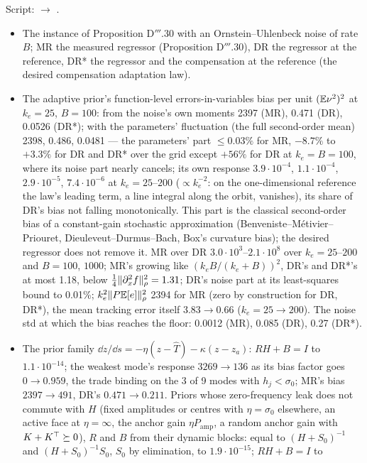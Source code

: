 Script:  $\to$ .
\begin{itemize}
  \item The instance of Proposition D$'''$.30 with an Ornstein--Uhlenbeck noise of rate $B$; MR the measured regressor
    (Proposition D$'''$.30), DR the regressor at the reference, DR* the regressor and the compensation at the
    reference (the desired compensation adaptation law).
  \item The adaptive prior's function-level errors-in-variables bias per unit $(\mathbb{E}\nu^2)^2$ at $k_e=25$, $B=100$: from
    the noise's own moments 2397 (MR), 0.471 (DR), 0.0526 (DR*); with the parameters' fluctuation (the full
    second-order mean) 2398, 0.486, 0.0481 --- the parameters' part $\le0.03\%$ for MR, $-8.7\%$ to $+3.3\%$ for DR
    and DR* over the grid except $+56\%$ for DR at $k_e=B=100$, where its noise part nearly cancels; its own response
    $3.9\cdot10^{-4}$, $1.1\cdot10^{-4}$, $2.9\cdot10^{-5}$, $7.4\cdot10^{-6}$ at $k_e=25$--$200$ ($\propto k_e^{-2}$:
    on the one-dimensional reference the law's leading term, a line integral along the orbit, vanishes), its share of
    DR's bias not falling monotonically. This part is the classical second-order bias of a constant-gain stochastic
    approximation (Benveniste--M\'etivier--Priouret, Dieuleveut--Durmus--Bach, Box's curvature bias); the desired
    regressor does not remove it. MR over DR $3.0\cdot10^3$--$2.1\cdot10^8$ over $k_e=25$--$200$ and $B=100$, $1000$;
    MR's growing like $(k_eB/(k_e+B))^2$, DR's and DR*'s at most 1.18, below $\frac14\lVert \partial^2_xf\rVert^2_\rho=1.31$;
    DR's noise part at its least-squares bound to 0.01\%; $k_e^2\lVert P\mathbb{E}[e]\rVert^2_\rho$ 2394 for MR (zero by
    construction for DR, DR*), the mean tracking error itself $3.83\to0.66$ ($k_e=25\to200$). The noise std at which
    the bias reaches the floor: 0.0012 (MR), 0.085 (DR), 0.27 (DR*).
  \item The prior family $\dd z/\dd s=-\eta(z-\hat T)-\kappa(z-z_a)$: $RH+B=I$ to $1.1\cdot10^{-14}$; the weakest
    mode's response $3269\to136$ as its bias factor goes $0\to0.959$, the trade binding on the 3 of 9 modes with
    $h_j<\sigma_0$; MR's bias $2397\to491$, DR's $0.471\to0.211$. Priors whose zero-frequency leak does not commute
    with $H$ (fixed amplitudes or centres with $\eta=\sigma_0$ elsewhere, an active face at $\eta=\infty$, the anchor
    gain $\eta P_{\mathrm{amp}}$, a random anchor gain with $K+K^\top\succeq0$), $R$ and $B$ from their dynamic blocks:
    equal to $(H+S_0)^{-1}$ and $(H+S_0)^{-1}S_0$, $S_0$ by elimination, to $1.9\cdot10^{-15}$; $RH+B=I$ to

\end{itemize}
